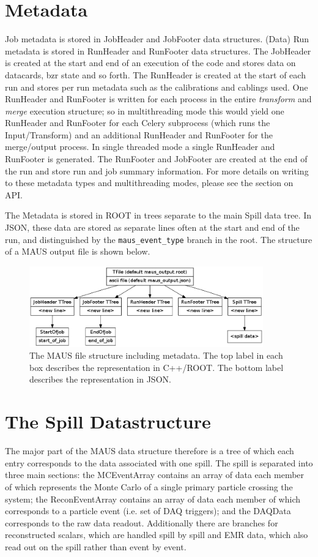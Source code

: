 \section{Metadata}
Job metadata is stored in JobHeader and JobFooter data structures. (Data) Run metadata is stored in RunHeader and RunFooter data structures. The JobHeader is created at the start and end of an execution of the code and stores data on datacards, bzr state and so forth. The RunHeader is created at the start of each run and stores per run metadata such as the calibrations and cablings used. One RunHeader and RunFooter is written for each process in the entire \emph{transform} and \emph{merge} execution structure; so in multithreading mode this would yield one RunHeader and RunFooter for each Celery subprocess (which runs the Input/Transform) and an additional RunHeader and RunFooter for the merge/output process. In single threaded mode a single RunHeader and RunFooter is generated. The RunFooter and JobFooter are created at the end of the run and store run and job summary information. For more details on writing to these metadata types and multithreading modes, please see the section on API.

The Metadata is stored in ROOT in trees separate to the main Spill data tree. In JSON, these data are stored as separate lines often at the start and end of the run, and distinguished by the \verb|maus_event_type| branch in the root. The structure of a MAUS output file is shown below.

\begin{figure}[!htb]
\centering
\includegraphics[width=0.9\textwidth]{file_structure.png}
\caption{The MAUS file structure including metadata. The top label in each box describes the representation in C++/ROOT. The bottom label describes the representation in JSON.}
\end{figure}


\section{The Spill Datastructure}
The major part of the MAUS data structure therefore is a tree of which each entry corresponds to the data associated with one spill. The spill is separated into three main sections: the MCEventArray contains an array of data each member of which represents the Monte Carlo of a single primary particle crossing the system; the ReconEventArray contains an array of data each member of which corresponds to a particle event (i.e. set of DAQ triggers); and the DAQData corresponds to the raw data readout. Additionally there are branches for reconstructed scalars, which are handled spill by spill and EMR data, which also read out on the spill rather than event by event.

